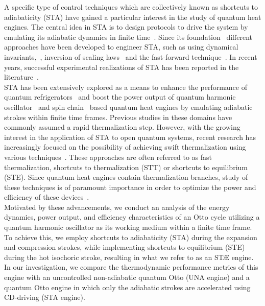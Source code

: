 \documentclass[aps,pra,twocolumn,showpacs,showkeys,groupedaddress,nobalancelastpage,nofootinbib,floatfix,superscriptaddress,longbibliography]{revtex4-2}
\begin{document}
A specific type of control techniques which are collectively known as shortcuts to adiabaticity (STA) have gained a particular interest in the study of quantum heat engines. The central idea in STA is to design protocols to drive the system by emulating its adiabatic dynamics in finite time~\cite{TORRONTEGUI2013117,RevModPhys.91.045001}. Since its foundation~\cite{doi:10.1021/jp030708a,doi:10.1021/jp040647w,Berry_2009,PhysRevLett.104.063002} different approaches have been developed to engineer STA, such as using dynamical invariants,~\cite{PhysRevLett.104.063002,PhysRevA.83.062116}, inversion of scaling laws~\cite{PhysRevA.84.031606,Campo2012} and the fast-forward technique~\cite{doi:10.1098/rspa.2009.0446,PhysRevA.84.043434,PhysRevA.86.013601}. In recent years, successful experimental realizations of STA has been reported in the literature~\cite{doi:10.1126/sciadv.aau5999,https://doi.org/10.1002/qute.201900121,PhysRevApplied.13.044059,Yin2022}.\\

STA has been extensively explored as a means to enhance the performance of quantum refrigerators~\cite{PhysRevB.100.035407,PhysRevResearch.2.023120} and boost the power output of quantum harmonic oscillator~\cite{Campo2014,PhysRevE.98.032121,PhysRevE.99.022110,e18050168} and spin chain~\cite{PhysRevE.99.032108,PhysRevResearch.2.023145,_AKMAK_2021} based quantum heat engines by emulating adiabatic strokes within finite time frames. Previous studies in these domains have commonly assumed a rapid thermalization step. However, with the growing interest in the application of STA to open quantum systems, recent research has increasingly focused on the possibility of achieving swift thermalization using various techniques~\cite{PhysRevA.98.052129,PhysRevLett.122.250402,PhysRevA.100.012126,Alipour2020shortcutsto,PhysRevResearch.2.033178,PhysRevX.10.031015,Suri2018,Dann_2020}. These approaches are often referred to as fast thermalization, shortcuts to thermalization (STT) or shortcuts to equilibrium (STE). Since quantum heat engines contain thermalization branches, study of these techniques is of paramount importance in order to optimize the power and efficiency of these devices~\cite{PhysRevA.100.012126,PhysRevX.10.031015,Suri2018,Dann_2020}.\\

Motivated by these advancements, we conduct an analysis of the energy dynamics, power output, and efficiency characteristics of an Otto cycle utilizing a quantum harmonic oscillator as its working medium within a finite time frame. To achieve this, we employ shortcuts to adiabaticity (STA) during the expansion and compression strokes, while implementing shortcuts to equilibrium (STE) during the hot isochoric stroke, resulting in what we refer to as an ST{\AE} engine. In our investigation, we compare the thermodynamic performance metrics of this engine with an uncontrolled non-adiabatic quantum Otto (UNA engine) and a quantum Otto engine in which only the adiabatic strokes are accelerated using CD-driving (STA engine).\\
\end{document}
